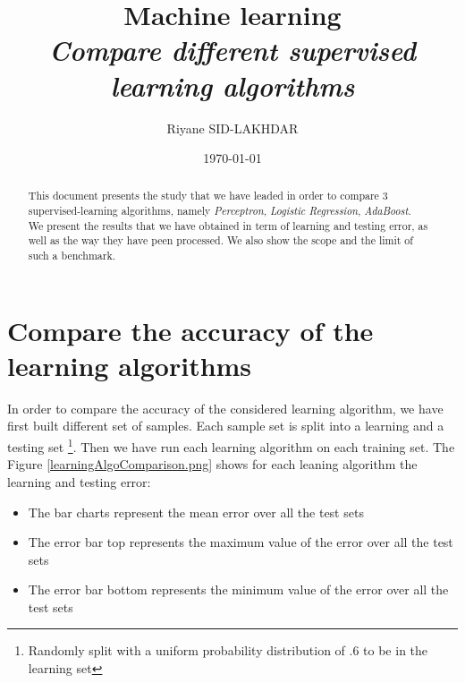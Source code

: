 \documentclass[12pt]{article}											%
\title
{
	Machine learning\\
    \emph{Compare different supervised learning algorithms}
}
\author{Riyane SID-LAKHDAR}
\date{\today}
\begin{document}
\maketitle

\begin{abstract}
This document presents the study that we have leaded in order to compare 3 supervised-learning algorithms, namely \emph{Perceptron}, \emph{Logistic Regression}, \emph{AdaBoost}.\\
We present the results that we have obtained in term of learning and testing error, as well as the way they have peen processed.   We also show the scope and the limit of such a benchmark.
\end{abstract}
\tableofcontents
\newpage



\section{Compare the accuracy of the learning algorithms}
In order to compare the accuracy of the considered learning algorithm, we have first built different set of samples.   Each sample set is split into a learning and a testing set \footnote{Randomly split with a uniform probability distribution of .6 to be in the learning set}.    Then we have run each learning algorithm on each training set.   The Figure \ref{learningAlgoComparison.png} shows for each leaning algorithm the learning and testing error:
\begin{itemize}
	\item The bar charts represent the mean error over all the test sets
	\item The error bar top represents the maximum value of the error over all the test sets
	\item The error bar bottom represents the minimum value of the error over all the test sets
\end{itemize}
\end{document}
